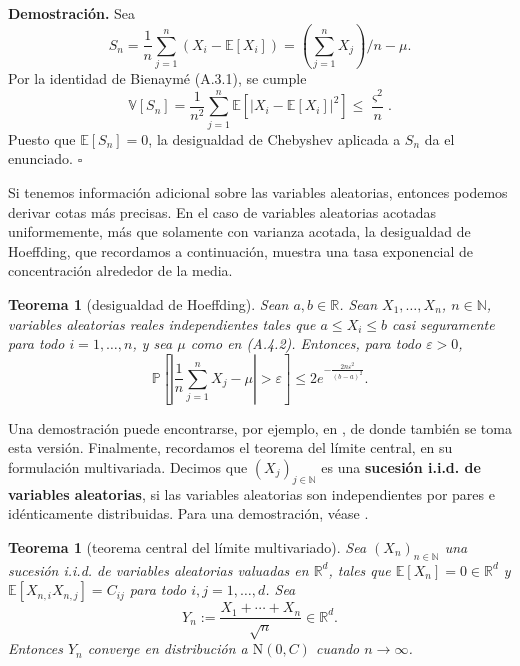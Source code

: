 \documentclass[11pt]{report}
\newenvironment{tcolorbox}[1][]{\par\medskip\noindent\ignorespaces}{\par\medskip}
\theoremstyle{definition}
\theoremstyle{plain}
\newtheorem{teorema}[definicion]{Teorema}
\numberwithin{equation}{section}
\begin{document}
\textbf{Demostración.} Sea
\begin{equation*}
    S_n=\frac{1}{n}\sum_{j=1}^{n}(X_i-\mathbb{E}[X_i])
    =
    \left(\sum_{j=1}^{n}X_j\right)/n-\mu.
\end{equation*}
Por la identidad de Bienaymé (A.3.1), se cumple
\begin{equation*}
    \mathbb{V}[S_n]
    =
    \frac{1}{n^2}\sum_{j=1}^{n}
    \mathbb{E}[|X_i-\mathbb{E}[X_i]|^2]
    \leq
    \frac{\varsigma^2}{n}.
\end{equation*}
Puesto que \(\mathbb{E}[S_n]=0\), la desigualdad de Chebyshev aplicada a \(S_n\) da el enunciado. \(\square\)

Si tenemos información adicional sobre las variables aleatorias, entonces podemos derivar cotas más precisas. En el caso de variables aleatorias acotadas uniformemente, más que solamente con varianza acotada, la desigualdad de Hoeffding, que recordamos a continuación, muestra una tasa exponencial de concentración alrededor de la media.

\begin{tcolorbox}[colback=blue!8, colframe=blue!8, boxrule=0pt]
\begin{teorema}[desigualdad de Hoeffding]
Sean \(a,b\in\mathbb{R}\). Sean \(X_1,\ldots,X_n\), \(n\in\mathbb{N}\), variables aleatorias reales independientes tales que \(a\leq X_i\leq b\) casi seguramente para todo \(i=1,\ldots,n\), y sea \(\mu\) como en (A.4.2). Entonces, para todo \(\varepsilon>0\),
\begin{equation*}
    \mathbb{P}
    \left[
        \left|
            \frac{1}{n}\sum_{j=1}^{n}X_j-\mu
        \right|
        >
        \varepsilon
    \right]
    \leq
    2e^{-\frac{2n\varepsilon^2}{(b-a)^2}}.
\end{equation*}
\end{teorema}
\end{tcolorbox}

Una demostración puede encontrarse, por ejemplo, en \cite[Sección B.4]{shorack-2017}, de donde también se toma esta versión. Finalmente, recordamos el teorema del límite central, en su formulación multivariada. Decimos que \((X_j)_{j\in\mathbb{N}}\) es una \textbf{sucesión i.i.d. de variables aleatorias}, si las variables aleatorias son independientes por pares e idénticamente distribuidas. Para una demostración, véase \cite[Teorema 15.58]{klenke-2014}.

\begin{tcolorbox}[colback=blue!8, colframe=blue!8, boxrule=0pt]
\begin{teorema}[teorema central del límite multivariado]
Sea \((X_n)_{n\in\mathbb{N}}\) una sucesión i.i.d. de variables aleatorias valuadas en \(\mathbb{R}^d\), tales que \(\mathbb{E}[X_n]=0\in\mathbb{R}^d\) y \(\mathbb{E}[X_{n,i}X_{n,j}]=C_{ij}\) para todo \(i,j=1,\ldots,d\). Sea
\begin{equation*}
    Y_n:=
    \frac{X_1+\cdots+X_n}{\sqrt{n}}
    \in\mathbb{R}^d.
\end{equation*}
Entonces \(Y_n\) converge en distribución a \(\mathrm{N}(0,C)\) cuando \(n\to\infty\).
\end{teorema}
\end{tcolorbox}
\end{document}
